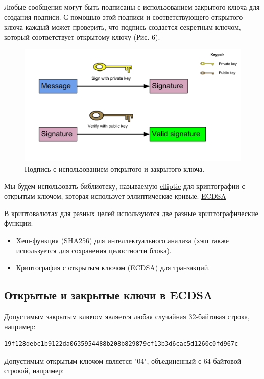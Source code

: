 \documentclass{article}
\begin{document}
Любые сообщения могут быть подписаны с использованием закрытого ключа для создания подписи. С помощью этой подписи и соответствующего открытого ключа каждый может проверить, что подпись создается секретным ключом, который соответствует открытому ключу (Рис. 6).

\begin{figure}
	\centering
	\includegraphics[scale=0.45]{signature}
	\caption{Подпись с использованием открытого и закрытого ключа.}
	\label{fig:signature}
\end{figure}

Мы будем использовать библиотеку, называемую \href{https://github.com/indutny/elliptic}{elliptic} для криптографии с открытым ключом, которая использует эллиптические кривые. \href{https://en.wikipedia.org/wiki/Elliptic_Curve_Digital_Signature_Algorithm}{ECDSA}

В криптовалютах для разных целей используются две разные криптографические функции:
\begin{itemize}
	\item Хеш-функция (SHA256) для интеллектуального анализа (хэш также используется для сохранения целостности блока).
	\item Криптография с открытым ключом (ECDSA) для транзакций.
\end{itemize}

\subsection{Открытые и закрытые ключи в ECDSA}

Допустимым закрытым ключом является любая случайная 32-байтовая строка, например:
 
\begin{lstlisting}
19f128debc1b9122da0635954488b208b829879cf13b3d6cac5d1260c0fd967c
\end{lstlisting}
Допустимым открытым ключом является "04", объединенный с 64-байтовой строкой, например: 
\end{document}
